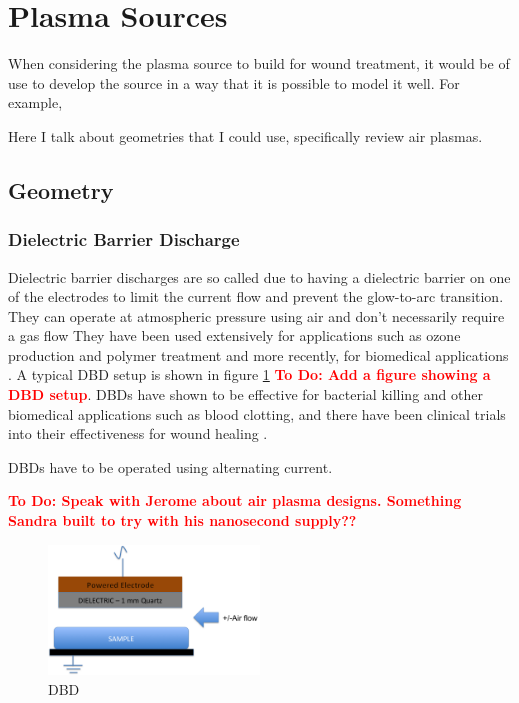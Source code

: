 \documentclass[11pt, oneside]{article}   	%
\newcommand{\todo}[1]{ \textcolor{red}{\bf{To Do:} #1}}
\begin{document}
\section{Plasma Sources}
When considering the plasma source to build for wound treatment, it would be of use to develop the source in a way that it is possible to model it well.
For example, 


Here I talk about geometries that I could use, specifically review air plasmas.
\subsection{Geometry}
\subsubsection{Dielectric Barrier Discharge}
Dielectric barrier discharges are so called due to having a dielectric barrier on one of the electrodes to limit the current flow and prevent the glow-to-arc transition. 
They can operate at atmospheric pressure using air and don't necessarily require a gas flow \cite{Fridman2013plasmamedicine}
They have been used extensively for applications such as ozone production and polymer treatment and more recently, for biomedical applications \cite{Fridman2013plasmamedicine, Brehmer2015alleviation}.
A typical DBD setup is shown in figure \ref{fig:DBD} \todo{Add a figure showing a DBD setup}.
DBDs have shown to be effective for bacterial killing and other biomedical applications such as blood clotting, and there have been clinical trials into their effectiveness for wound healing \cite{Daeschlein2012in, Fridman2006blood, Brehmer2015alleviation}. 

DBDs have to be operated using alternating current.


\todo{Speak with Jerome about air plasma designs. Something Sandra built to try with his nanosecond supply??}


\begin{figure}
\centering
\includegraphics[width=0.5\textwidth]{Figures/DBD}
\caption{DBD}
\label{fig:DBD}
\end{figure}
\end{document}
